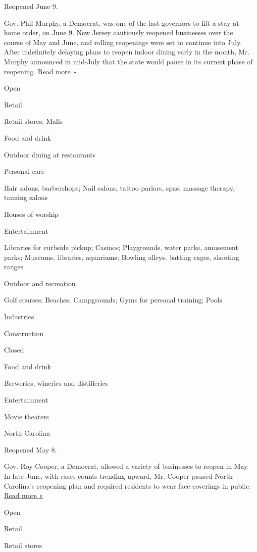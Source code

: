 Reopened June 9.

Gov. Phil Murphy, a Democrat, was one of the last governors to lift a
stay-at-home order, on June 9. New Jersey cautiously reopened businesses
over the course of May and June, and rolling reopenings were set to
continue into July. After indefinitely delaying plans to reopen indoor
dining early in the month, Mr. Murphy announced in mid-July that the
state would pause in its current phase of reopening.
\href{https://www.nj.com/coronavirus/2020/07/murphy-hitting-pause-on-reopening-as-coronavirus-rate-of-transmission-rises.html}{Read
more »}

Open

Retail

Retail stores; Malls

Food and drink

Outdoor dining at restaurants

Personal care

Hair salons, barbershops; Nail salons, tattoo parlors, spas, massage
therapy, tanning salons

Houses of worship

Entertainment

Libraries for curbside pickup; Casinos; Playgrounds, water parks,
amusement parks; Museums, libraries, aquariums; Bowling alleys, batting
cages, shooting ranges

Outdoor and recreation

Golf courses; Beaches; Campgrounds; Gyms for personal training; Pools

Industries

Construction

Closed

Food and drink

Breweries, wineries and distilleries

Entertainment

Movie theaters

North Carolina

Reopened May 8.

Gov. Roy Cooper, a Democrat, allowed a variety of businesses to reopen
in May. In late June, with cases counts trending upward, Mr. Cooper
paused North Carolina's reopening plan and required residents to wear
face coverings in public.
\href{https://www.newsobserver.com/news/coronavirus/article244212852.html}{Read
more »}

Open

Retail

Retail stores

